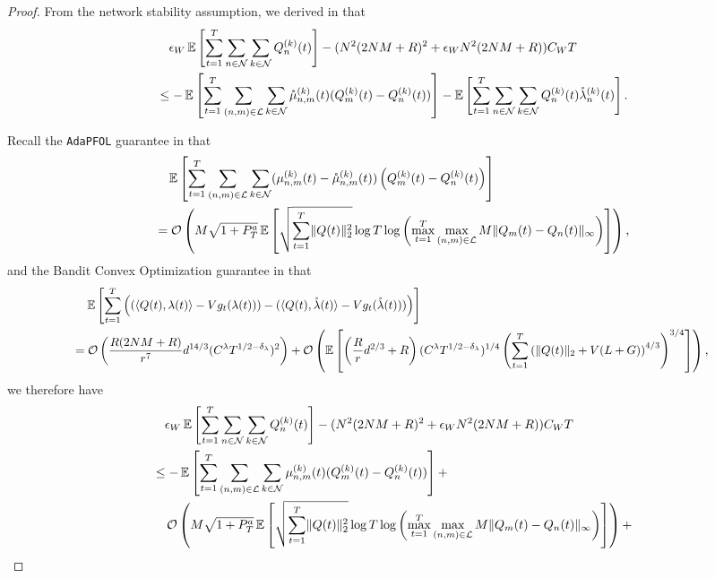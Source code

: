 \documentclass[11pt,fullpage,letterpaper]{article} %
\renewcommand{\bm}[1]{#1}%
\renewcommand{\O}{\operatorname{\mathcal O}}
\newcommand{\E}{\operatornamewithlimits{\mathbb{E}}}
\newcommand{\mN}{{\mathcal N}}
\newcommand{\mL}{{\mathcal L}}
\newcommand{\OLOAlg}{\texttt{AdaPFOL}\xspace}
\newcommand\scalemath[2]{\scalebox{#1}{\mbox{\ensuremath{\displaystyle #2}}}}
\begin{document}
\begin{proof}
From the network stability assumption, we derived in  that
\begin{align*}
&\quad \epsilon_W \E\left [\sum_{t=1}^T \sum_{n\in \mN} \sum_{k\in \mN} Q_n^{(k)}(t)\right ] - (N^2 (2NM+R)^2 + \epsilon_W N^2 (2NM+R)) C_W T \nonumber\\
&\le -\E\left [\sum_{t=1}^T \sum_{(n,m)\in \mL}\sum_{k\in \mN} \mathring \mu_{n,m}^{(k)}(t) (Q_m^{(k)}(t) - Q_n^{(k)}(t))\right ] - \E\left [\sum_{t=1}^T \sum_{n\in \mN} \sum_{k\in \mN} Q_n^{(k)}(t) \mathring \lambda_n^{(k)}(t)\right ].
\end{align*}

Recall the \OLOAlg guarantee in  that
\begin{align*}
&\quad \E\left [\sum_{t=1}^T \sum_{(n,m)\in \mL} \sum_{k\in \mN} (\mu_{n,m}^{(k)}(t)-\mathring{\mu}_{n,m}^{(k)}(t))\left (Q_m^{(k)}(t)-Q_n^{(k)}(t)\right )\right ]\\
&=\O\left (M\sqrt{1+P_T^a} \E\left [\sqrt{\sum_{t=1}^T \lVert \bm Q(t)\rVert_2^2} \log T \log \left (\max_{t=1}^T \max_{(n,m)\in \mL} M \lVert \bm Q_m(t) - \bm Q_n(t)\rVert_\infty\right )\right ]\right )\text{,}
\end{align*}
and the Bandit Convex Optimization guarantee in  that
\begin{align*}
&\scalemath{0.95}{\quad \E\left [\sum_{t=1}^T \left ((\langle \bm Q(t),\bm \lambda(t)\rangle - Vg_t(\bm \lambda(t))) - (\langle \bm Q(t),\mathring{\bm \lambda}(t)\rangle - Vg_t(\mathring{\bm \lambda}(t)))\right )\right ]}\\
&\scalemath{0.95}{=\O\left (\frac{R(2NM+R)}{r^7} d^{14/3} (C^\lambda T^{1/2-\delta_\lambda})^2\right )+\O\left (\E\left [\left (\frac{R}{r} d^{2/3}+R\right ) (C^\lambda T^{1/2 - \delta_\lambda})^{1/4} \left (\sum_{t=1}^T \left (\lVert \bm Q(t)\rVert_2 + V(L+G)\right )^{4/3}\right )^{3/4}\right ]\right ),}
\end{align*}
we therefore have
\begin{align*}
&\quad \epsilon_W \E\left [\sum_{t=1}^T \sum_{n\in \mN} \sum_{k\in \mN} Q_n^{(k)}(t)\right ] - (N^2 (2NM+R)^2 + \epsilon_W N^2 (2NM+R)) C_W T \nonumber\\
&\le -\E\left [\sum_{t=1}^T \sum_{(n,m)\in \mL}\sum_{k\in \mN} \mu_{n,m}^{(k)}(t) (Q_m^{(k)}(t) - Q_n^{(k)}(t))\right ] + \\
&\quad \O\left (M \sqrt{1+P_T^a} \E\left [\sqrt{\sum_{t=1}^T \lVert \bm Q(t)\rVert_2^2} \log T \log \left (\max_{t=1}^T \max_{(n,m)\in \mL} M \lVert \bm Q_m(t) - \bm Q_n(t)\rVert_\infty\right )\right ]\right )+\\

\end{align*}
\end{proof}
\end{document}
